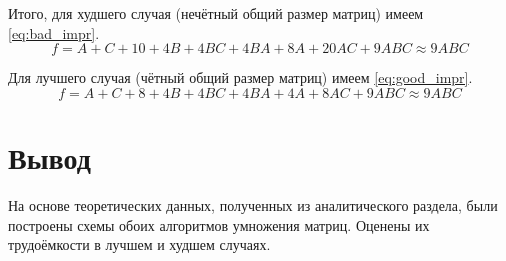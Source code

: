 Итого, для худшего случая (нечётный общий размер матриц) имеем \eqref{eq:bad_impr}.
\begin{equation}
    \label{eq:bad_impr}
    f = A + C + 10 + 4B + 4BC + 4BA + 8A + 20AC + 9ABC \approx 9ABC
\end{equation}

Для лучшего случая (чётный общий размер матриц) имеем \eqref{eq:good_impr}.
\begin{equation}
    \label{eq:good_impr}
    f = A + C + 8 + 4B +4BC + 4BA + 4A + 8AC + 9ABC \approx 9ABC
\end{equation}

\section*{Вывод}
На основе теоретических данных, полученных из аналитического раздела, были построены схемы обоих алгоритмов умножения матриц.
Оценены их трудоёмкости в лучшем и худшем случаях.
